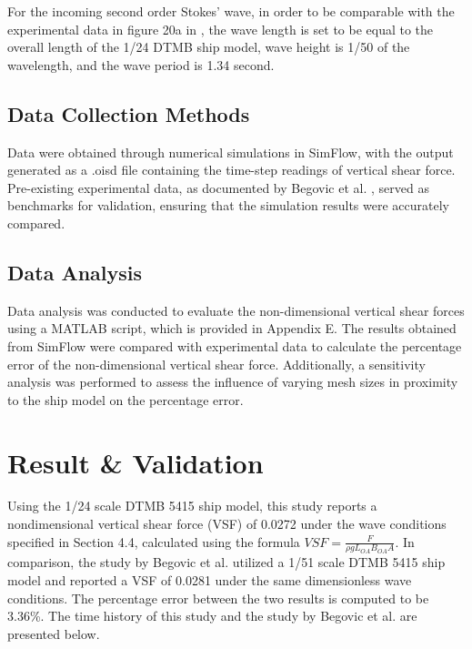 \documentclass[12pt]{article} %
\begin{document}
For the incoming second order Stokes' wave, in order to be comparable with the experimental data in figure 20a in \cite{Begovic2017}, the wave length is set to be equal to the 
overall length of the 1/24 DTMB ship model, wave height is 1/50 of the wavelength, and the wave period is 1.34 second.

\subsection{Data Collection Methods}
Data were obtained through numerical simulations in SimFlow, with the output generated as a .oisd file 
containing the time-step readings of vertical shear force. Pre-existing experimental data, as documented 
by Begovic et al. \cite{Begovic2017}, served as benchmarks for validation, ensuring that the simulation 
results were accurately compared.

\subsection{Data Analysis}
Data analysis was conducted to evaluate the non-dimensional vertical shear forces using a MATLAB script, which is provided 
in Appendix E. The results obtained from SimFlow were compared with experimental data to calculate the 
percentage error of the non-dimensional vertical shear force. Additionally, a sensitivity analysis was 
performed to assess the influence of varying mesh sizes in proximity to the ship model on the percentage error.

\clearpage
\section{Result \& Validation}
Using the 1/24 scale DTMB 5415 ship model, this study reports a nondimensional vertical shear force 
(VSF) of 0.0272 under the wave conditions specified in Section 4.4, calculated using the formula 
\( VSF = \frac{F}{\rho g L_{OA} B_{OA} A} \). In comparison, the study by Begovic et al. \cite{Begovic2017} 
utilized a 1/51 scale DTMB 5415 ship model and reported a VSF of 0.0281 under the same dimensionless wave 
conditions. The percentage error between the two results is computed to be 3.36\%. The time history of this study and 
the study by Begovic et al. \cite{Begovic2017} are presented below.
\end{document}
